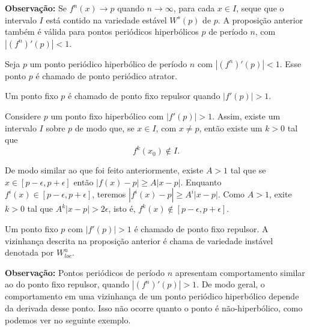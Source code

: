 \documentclass[../IC.tex]{subfiles}
\begin{document}
	\textbf{Observação:} Se $f^n(x)\to p$ quando $n \to \infty$, para cada $x \in I$, seque que o intervalo $I$ está contido na variedade estável $W^s(p)$ de $p$. A proposição anterior também é válida para pontos periódicos hiperbólicos $p$ de período $n$, com $|(f^n)'(p)|<1$.
	
	\begin{definicao}
		Seja $p$ um ponto periódico hiperbólico de período $n$ com $|(f^n)'(p)|<1$. Esse ponto $p$ é chamado de ponto periódico atrator.
	\end{definicao}
	
	\begin{definicao}
		Um ponto fixo $p$ é chamado de ponto fixo repulsor quando $|f'(p)| > 1$.
	\end{definicao}
	
	\begin{proposicao}
		Considere $p$ um ponto fixo hiperbólico com $|f'(p)| > 1$. Assim, existe um intervalo $I$ sobre $p$ de modo que, se $x \in I$, com $x \neq p$, então existe um $k > 0$ tal que $$f^k(x_0) \notin I.$$
	\end{proposicao}
	
	\begin{prova}
		De modo similar ao que foi feito anteriormente, existe $A>1$ tal que se $x \in [p-\epsilon, p+\epsilon]$ então $|f(x)-p|\geq A|x-p|$. Enquanto $f^i(x) \in [p-\epsilon, p+\epsilon]$, teremos $|f^i(x)-p| \geq A^i|x-p|$.
		Como $A>1$, exite $k>0$ tal que $A^k|x-p|>2\epsilon$, isto é, $f^k(x)\notin [p-\epsilon, p+\epsilon]$.
	\end{prova}
	
	\begin{definicao}
		Um ponto fixo $p$ com $|f'(p)|>1$ é chamado de ponto fixo repulsor. A vizinhança descrita na proposição anterior é chama de variedade instável denotada por $W_{loc}^u$.
	\end{definicao}
	
	\textbf{Observação:} Pontos periódicos de período $n$ apresentam comportamento similar ao do ponto fixo repulsor, quando $|(f^n)'(p)| >1$. De modo geral, o comportamento em uma vizinhança de um ponto periódico hiperbólico depende da derivada desse ponto. Isso não ocorre quanto o ponto é não-hiperbólico, como podemos ver no seguinte exemplo.
	
\end{document}

